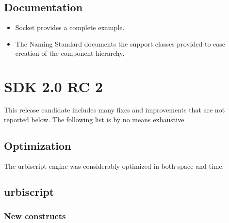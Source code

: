 \subsection{Documentation}

\begin{itemize}
\item Socket provides a complete example.
\item The Naming Standard documents the support classes provided to ease
  creation of the component hierarchy.
\end{itemize}

\section{\urbi SDK 2.0 RC 2}

This release candidate includes many fixes and improvements that are
not reported below. The following list is by no means exhaustive.

\subsection{Optimization}

The urbiscript engine was considerably optimized in both space and
time.

\subsection{urbiscript}

\subsubsection{New constructs}


